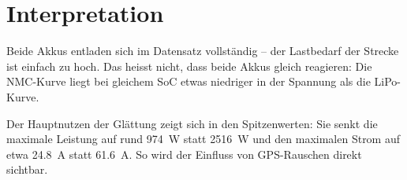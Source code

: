 \section{Interpretation}

Beide Akkus entladen sich im Datensatz vollständig -- der Lastbedarf der Strecke ist einfach zu hoch. Das heisst nicht, dass beide Akkus gleich reagieren: Die NMC-Kurve liegt bei gleichem SoC etwas niedriger in der Spannung als die LiPo-Kurve.

Der Hauptnutzen der Glättung zeigt sich in den Spitzenwerten: Sie senkt die maximale Leistung auf rund \SI{974}{\watt} statt \SI{2516}{\watt} und den maximalen Strom auf etwa \SI{24.8}{\ampere} statt \SI{61.6}{\ampere}. So wird der Einfluss von GPS-Rauschen direkt sichtbar.
